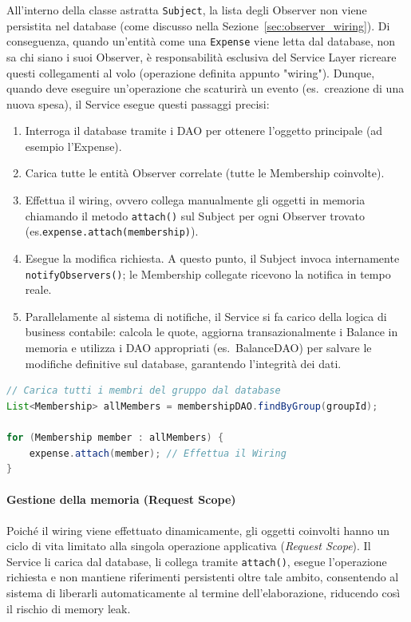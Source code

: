 All'interno della classe astratta \texttt{Subject}, la lista degli Observer 
non viene persistita nel database (come discusso nella Sezione~\ref{sec:observer_wiring}).
Di conseguenza, quando un'entità come una \texttt{Expense} viene letta dal database, non sa chi siano i suoi Observer,
è responsabilità esclusiva del Service Layer ricreare questi collegamenti al volo (operazione definita appunto "wiring").
Dunque, quando deve eseguire un'operazione che scaturirà un evento (es.\ creazione di una nuova spesa), 
il Service esegue questi passaggi precisi:
\begin{enumerate}
    \item Interroga il database tramite i DAO per ottenere l'oggetto principale (ad esempio l'Expense).
    \item Carica tutte le entità Observer correlate (tutte le Membership coinvolte).
    \item Effettua il wiring, ovvero collega manualmente gli oggetti in memoria chiamando il metodo \texttt{attach()} sul Subject per ogni Observer trovato (es.\texttt{expense.attach(membership)}).
    \item Esegue la modifica richiesta. A questo punto, il Subject invoca internamente \texttt{notifyObservers()}; le Membership collegate ricevono la notifica in tempo reale.
    \item Parallelamente al sistema di notifiche, il Service si fa carico della logica di business contabile: calcola le quote, aggiorna transazionalmente i Balance in memoria e utilizza i DAO appropriati (es.\ BalanceDAO) per salvare le modifiche definitive sul database, garantendo l'integrità dei dati.
\end{enumerate}

\begin{lstlisting}[language=Java, caption={Implementazione del Wiring dinamico in ExpenseService}]
// Carica tutti i membri del gruppo dal database
List<Membership> allMembers = membershipDAO.findByGroup(groupId);

for (Membership member : allMembers) {
    expense.attach(member); // Effettua il Wiring
}


\end{lstlisting}
\paragraph{Gestione della memoria (Request Scope)}
Poiché il wiring viene effettuato dinamicamente, gli oggetti coinvolti hanno
un ciclo di vita limitato alla singola operazione applicativa (\textit{Request Scope}).
Il Service li carica dal database, li collega tramite \texttt{attach()},
esegue l’operazione richiesta e non mantiene riferimenti persistenti oltre
tale ambito, consentendo al sistema di liberarli automaticamente al termine
dell’elaborazione, riducendo così il rischio di memory leak.



